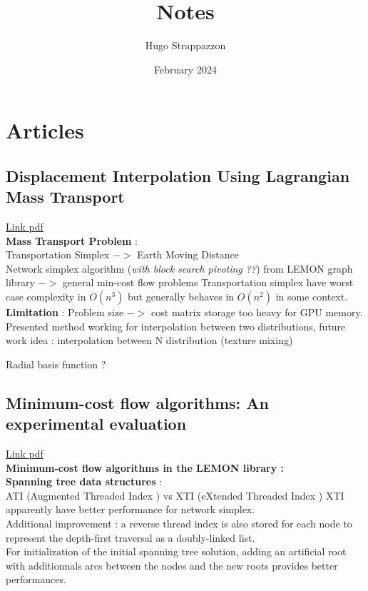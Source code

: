\documentclass{article}
\title{Notes}
\author{Hugo Strappazzon}
\date{February 2024}
\begin{document}
\maketitle

\section*{Articles}
\subsection*{Displacement Interpolation Using Lagrangian Mass Transport}
\href{https://www.researchgate.net/publication/220183864_Displacement_Interpolation_Using_Lagrangian_Mass_Transport}{Link pdf}\\
\textbf{Mass Transport Problem} :\\
Transportation Simplex $->$ Earth Moving Distance\\
Network simplex algorithm (\textit{with block search pivoting ??}) from LEMON graph library $->$ general min-cost flow problems
Transportation simplex have worst case complexity in $O(n^3)$ but generally behaves in $O(n^2)$ in some context.\\

\noindent\textbf{Limitation} : Problem size $->$ cost matrix storage too heavy for GPU memory.
Presented method working for interpolation between two distributions, future work idea : interpolation between N distribution (texture mixing)

Radial basis function ?

\subsection*{Minimum-cost flow algorithms: An experimental evaluation}
\href{https://egres.elte.hu/tr/egres-13-04_September_2013.pdf}{Link pdf}\\
\textbf{Minimum-cost flow algorithms in the LEMON library :}\\

\noindent\textbf{Spanning tree data structures} :\\
\noindent ATI (Augmented Threaded Index ) vs  XTI (eXtended Threaded Index ) XTI apparently have better performance for network simplex.\\
Additional improvement : a reverse thread index is also stored for each node to represent the depth-first traversal as a doubly-linked list.\\
For initialization of the initial spanning tree solution, adding an artificial root with additionnals arcs between the nodes and the new roots provides better performances.\\
\end{document}

